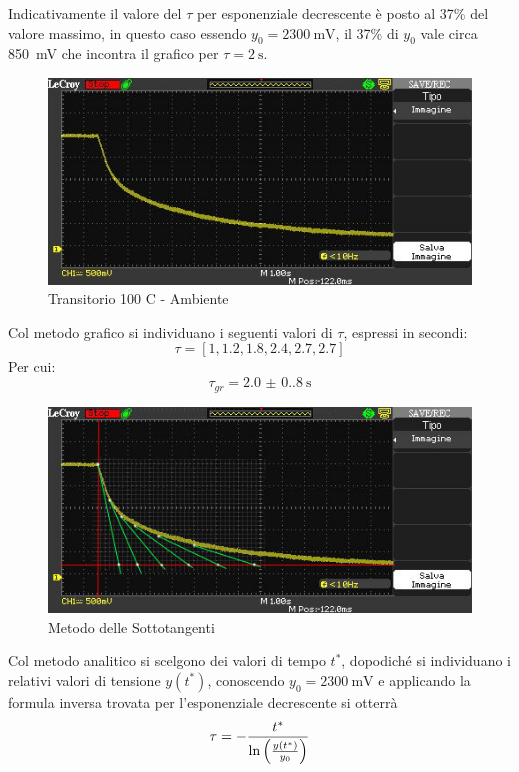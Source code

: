 \documentclass[a4paper, 12pt, twoside]{report}
\begin{document}
		Indicativamente il valore del $\tau$ per esponenziale decrescente è posto al 37\% del valore massimo, in questo caso essendo $y_0 = \SI{2300}{\milli\volt}$, il 37\% di $y_0$ vale circa \SI{850}{\milli\volt} che incontra il grafico per $\tau=\SI{2}{\second}$.		
		\begin{figure}[H]
			\centering
			\includegraphics[width=0.7\linewidth]{immaginioscillo/2}
			\caption[]{Transitorio 100 \degree C - Ambiente}
			\label{fig:3}
		\end{figure}		
		Col metodo grafico si individuano i seguenti valori di $\tau$, espressi in secondi:
		\[ \tau = [1, 1.2, 1.8, 2.4, 2.7, 2.7]\]
		Per cui:
		\[\tau_{gr} = \SI[separate-uncertainty = true]{2.0(0.8)}{\second}\]		
		\begin{figure}[H]
			\centering
			\includegraphics[width=0.7\linewidth]{immaginioscillo/2+}
			\caption{Metodo delle Sottotangenti}
			\label{fig:4}
		\end{figure}		
		Col metodo analitico si scelgono dei valori di tempo $t^*$, dopodiché si individuano i relativi valori di tensione $y(t^*)$, conoscendo $y_0 = \SI{2300}{\milli\volt}$ e applicando la formula inversa trovata per l'esponenziale decrescente si otterrà
		\[\tau = - \dfrac{t^*}{\ln\left(y(t^*)\over y_0\right)} \]		
\end{document}
